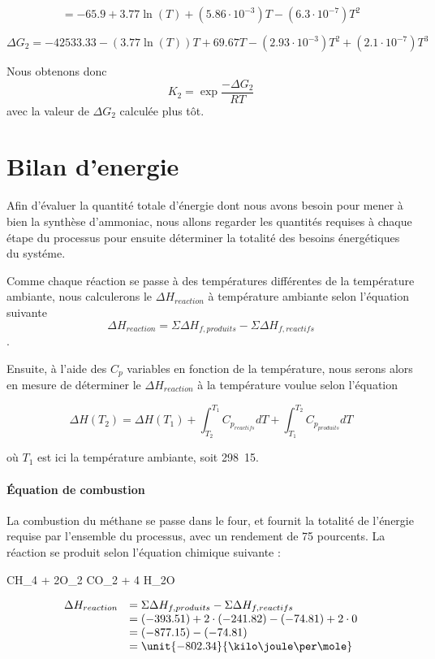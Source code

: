 \documentclass{article}
\begin{document}
 $$
 = -65.9 + 3.77 \ln(T) +(5.86\cdot 10^{-3})T -(6.3 \cdot 10^{-7})T^2
 $$ 
 
 $$
 \Delta G_2=-42533.33 - (3.77 \ln(T))T +69.67 T -(2.93 \cdot 10^{-3})T^2
 + (2.1\cdot 10^{-7})T^3 
 $$
 
Nous obtenons donc
$$K_2 = \exp{\frac{-\Delta G_2}{RT}}$$
avec la valeur de $\Delta G_2$ calculée plus tôt.

\section{Bilan d'energie}
Afin d'évaluer la quantité totale d'énergie dont nous avons besoin pour mener à 
bien la synthèse d'ammoniac, nous allons regarder les quantités requises à chaque 
étape du processus pour ensuite déterminer la totalité des besoins énergétiques du
systéme.

Comme chaque réaction se passe à des températures différentes de la température ambiante,
nous calculerons le $\Delta H_{reaction}$ à température ambiante selon l'équation suivante 
$$\Delta H_{reaction} = \Sigma \Delta H_{f,produits} - \Sigma \Delta H_{f,reactifs}$$.

Ensuite, à l'aide des $C_{p}$ variables en fonction de la température, nous serons alors en 
mesure de déterminer le $\Delta H_{reaction}$ à la température voulue selon l'équation

$$\Delta H(T_2) = \Delta H(T_{1}) 
+ \int_{T_2}^{T_1} C_{p_{reactifs}} dT + \int_{T_1}^{T_2} C_{p_{produits}} dT$$ 

où $T_1$ est ici la température ambiante, soit \unit{298.15}{\kelvin}.

\paragraph{\'Equation de combustion}
La combustion du méthane se passe dans le four, et fournit la totalité de l'énergie 
requise par l'ensemble du processus, avec un rendement de 75 pourcents.
La réaction se produit selon l'équation chimique suivante :

\begin{chemmath}
	CH_4 + 2O_2 \Longrightarrow CO_2 + 4 H_2O
\end{chemmath}

$$
	\begin{array}{rl}
	\Delta H_{reaction}		&=  \Sigma \Delta H_{f,produits} - \Sigma \Delta H_{f,reactifs} \\
												&=  (-393.51) + 2\cdot(-241.82) - (-74.81) + 2\cdot0 \\
												&=  (-877.15) - (-74.81)\\
												&=  \unit{-802.34}{\kilo\joule\per\mole}
	\end{array}
$$
\end{document}
